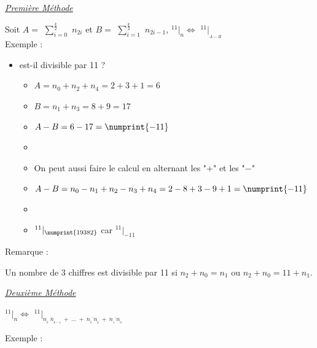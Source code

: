 \documentclass[a4paper]{article}
\begin{document}
{\noindent  \underline{\textit{Première Méthode}}}\\

\par Soit $A =$ {\Large $\sum\limits_{i=0}^{\frac{k}{2}}$} $n_{2i}$ et $B =$ {\Large $\sum\limits_{i=1}^{\frac{k}{2}}$} $n_{2i-1}$, {\huge $ ^{11}|_n \Leftrightarrow$ $^{11}|_{_{A-B}} $}\\

{ \parindent=0.5cm Exemple : }

\begin{small}
\begin{itemize}

	\item[]  est-il divisible par 11 ?
	\begin{itemize}
		\item[] $A = n_0 + n_2 + n_4 = 2 + 3 + 1 = 6$
		\item[] $B = n_1 + n_3 = 8 + 9 = 17$
		\item[] $A-B = 6 - 17 = \numprint{-11}$
		\item[]
		\item[] On peut aussi faire le calcul en alternant les "$+$" et les "$-$"
		\item[] $A-B = n_0 - n_1 + n_2 - n_3 + n_4 = 2 - 8 + 3 - 9 + 1 = \numprint{-11}$
		\item[]
		\item[] {\Large $^{11}|_{\numprint{19382}}$} car {\Large $^{11}|_{-11} $}\\
	\end{itemize}

\end{itemize}
\end{small}

{ \parindent=0.5cm Remarque : }
\par Un nombre de 3 chiffres est divisible par 11 si $n_2 + n_0 = n_1$ ou $n_2 + n_0 = 11 + n_1$.\\



\smallskip



{\noindent  \underline{\textit{Deuxième Méthode}}}

\begin{center}
	\huge
	$ ^{11}|_n \Leftrightarrow$ $^{11}|_{\overline{n_{_{k}}~n_{_{k - 1}}} ~+~\dots~+~\overline{n_{_3}~n_{_2}}~+~\overline{n_{_1}~n_{_0}}} $
\end{center}

{ \parindent=0.5cm Exemple : }
\end{document}
